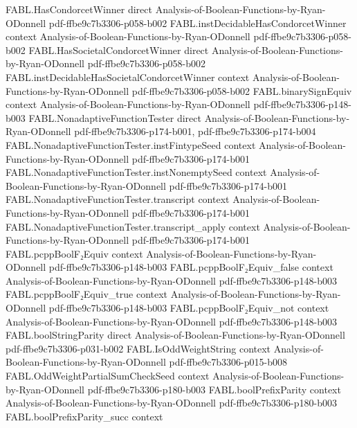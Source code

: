 \begin{theorem}
  {FABL.HasCondorcetWinner}
  {direct}
  {Analysis-of-Boolean-Functions-by-Ryan-ODonnell}
  {pdf-ffbe9c7b3306-p058-b002}
\proofstep
  {FABL.instDecidableHasCondorcetWinner}
  {context}
  {Analysis-of-Boolean-Functions-by-Ryan-ODonnell}
  {pdf-ffbe9c7b3306-p058-b002}
\proofstep
  {FABL.HasSocietalCondorcetWinner}
  {direct}
  {Analysis-of-Boolean-Functions-by-Ryan-ODonnell}
  {pdf-ffbe9c7b3306-p058-b002}
\proofstep
  {FABL.instDecidableHasSocietalCondorcetWinner}
  {context}
  {Analysis-of-Boolean-Functions-by-Ryan-ODonnell}
  {pdf-ffbe9c7b3306-p058-b002}
\proofstep
  {FABL.binarySignEquiv}
  {context}
  {Analysis-of-Boolean-Functions-by-Ryan-ODonnell}
  {pdf-ffbe9c7b3306-p148-b003}
\proofstep
  {FABL.NonadaptiveFunctionTester}
  {direct}
  {Analysis-of-Boolean-Functions-by-Ryan-ODonnell}
  {pdf-ffbe9c7b3306-p174-b001,
    pdf-ffbe9c7b3306-p174-b004}
\proofstep
  {FABL.NonadaptiveFunctionTester.instFintypeSeed}
  {context}
  {Analysis-of-Boolean-Functions-by-Ryan-ODonnell}
  {pdf-ffbe9c7b3306-p174-b001}
\proofstep
  {FABL.NonadaptiveFunctionTester.instNonemptySeed}
  {context}
  {Analysis-of-Boolean-Functions-by-Ryan-ODonnell}
  {pdf-ffbe9c7b3306-p174-b001}
\proofstep
  {FABL.NonadaptiveFunctionTester.transcript}
  {context}
  {Analysis-of-Boolean-Functions-by-Ryan-ODonnell}
  {pdf-ffbe9c7b3306-p174-b001}
\proofstep
  {FABL.NonadaptiveFunctionTester.transcript_apply}
  {context}
  {Analysis-of-Boolean-Functions-by-Ryan-ODonnell}
  {pdf-ffbe9c7b3306-p174-b001}
\proofstep
  {FABL.pcppBoolF₂Equiv}
  {context}
  {Analysis-of-Boolean-Functions-by-Ryan-ODonnell}
  {pdf-ffbe9c7b3306-p148-b003}
\proofstep
  {FABL.pcppBoolF₂Equiv_false}
  {context}
  {Analysis-of-Boolean-Functions-by-Ryan-ODonnell}
  {pdf-ffbe9c7b3306-p148-b003}
\proofstep
  {FABL.pcppBoolF₂Equiv_true}
  {context}
  {Analysis-of-Boolean-Functions-by-Ryan-ODonnell}
  {pdf-ffbe9c7b3306-p148-b003}
\proofstep
  {FABL.pcppBoolF₂Equiv_not}
  {context}
  {Analysis-of-Boolean-Functions-by-Ryan-ODonnell}
  {pdf-ffbe9c7b3306-p148-b003}
\proofstep
  {FABL.boolStringParity}
  {direct}
  {Analysis-of-Boolean-Functions-by-Ryan-ODonnell}
  {pdf-ffbe9c7b3306-p031-b002}
\proofstep
  {FABL.IsOddWeightString}
  {context}
  {Analysis-of-Boolean-Functions-by-Ryan-ODonnell}
  {pdf-ffbe9c7b3306-p015-b008}
\proofstep
  {FABL.OddWeightPartialSumCheckSeed}
  {context}
  {Analysis-of-Boolean-Functions-by-Ryan-ODonnell}
  {pdf-ffbe9c7b3306-p180-b003}
\proofstep
  {FABL.boolPrefixParity}
  {context}
  {Analysis-of-Boolean-Functions-by-Ryan-ODonnell}
  {pdf-ffbe9c7b3306-p180-b003}
\proofstep
  {FABL.boolPrefixParity_succ}
  {context}

\end{theorem}
